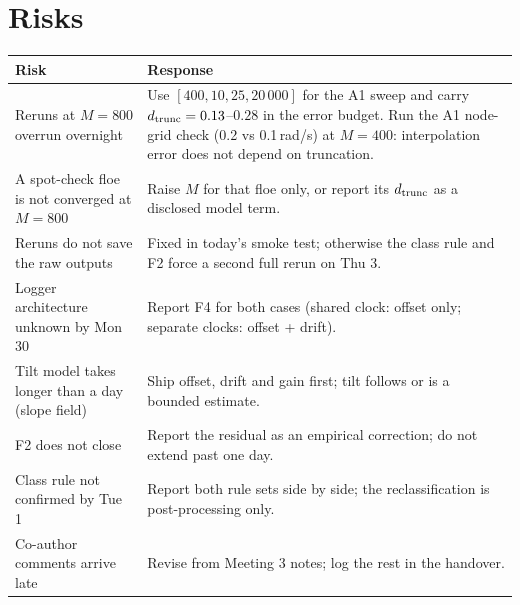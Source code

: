 \documentclass[10pt,a4paper]{article}
\begin{document}
\section{Risks}
\begin{center}\small
\begin{tabularx}{\linewidth}{@{}L L@{}}
\toprule
Risk & Response \\
\midrule
Reruns at $M=800$ overrun overnight & Use $[400,10,25,20\,000]$ for the A1 sweep and carry $d_{\rm trunc}=0.13$--$0.28$ in the error budget. Run the A1 node-grid check (0.2 vs 0.1\,rad/s) at $M=400$: interpolation error does not depend on truncation. \\
A spot-check floe is not converged at $M=800$ & Raise $M$ for that floe only, or report its $d_{\rm trunc}$ as a disclosed model term. \\
Reruns do not save the raw outputs & Fixed in today's smoke test; otherwise the class rule and F2 force a second full rerun on Thu 3. \\
Logger architecture unknown by Mon 30 & Report F4 for both cases (shared clock: offset only; separate clocks: offset + drift). \\
Tilt model takes longer than a day (slope field) & Ship offset, drift and gain first; tilt follows or is a bounded estimate. \\
F2 does not close & Report the residual as an empirical correction; do not extend past one day. \\
Class rule not confirmed by Tue 1 & Report both rule sets side by side; the reclassification is post-processing only. \\
Co-author comments arrive late & Revise from Meeting 3 notes; log the rest in the handover. \\
\bottomrule
\end{tabularx}
\end{center}
\end{document}
